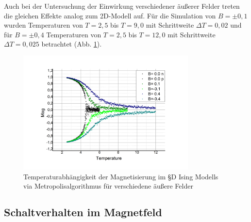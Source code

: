 Auch bei der Untersuchung der Einwirkung verschiedener äußerer Felder treten die gleichen Effekte analog zum 2D-Modell auf. Für die Simulation von $B=\pm 0,1$ wurden Temperaturen von $T=2,5$ bis $T=9,0$ mit Schrittweite $\Delta T= 0,02$ und für $B=\pm 0,4$ Temperaturen von $T=2,5$ bis $T=12,0$ mit Schrittweite $\Delta T= 0,025$ betrachtet (Abb. \ref{mp3db}).
 \begin{figure}[H]
	\centering
	\includegraphics[width=0.8\textwidth]{../Graph_Export/MP3D/m(T)_MP3D_Plot.jpg}	
	\caption{Temperaturabhängigkeit der Magnetisierung im §D Ising Modells via Metropolisalgorithmus für verschiedene äußere Felder}
	\label{mp3db}
\end{figure}


\subsection{Schaltverhalten im Magnetfeld}
\label{auswB}

